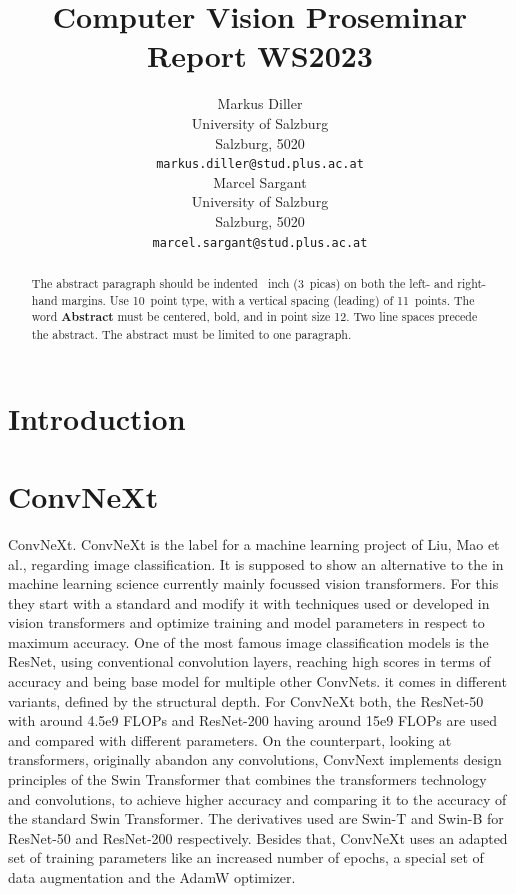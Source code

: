 \documentclass{article}
\title{Computer Vision Proseminar Report WS2023}
\author{%
    Markus Diller\\
    University of Salzburg\\
    Salzburg, 5020 \\
    \texttt{markus.diller@stud.plus.ac.at} \\
    \And
    Marcel Sargant \\
    University of Salzburg \\
    Salzburg, 5020 \\
    \texttt{marcel.sargant@stud.plus.ac.at} \\
}
\begin{document}
\maketitle


\begin{abstract}
    The abstract paragraph should be indented ~inch (3~picas) on both the left- and right-hand margins.
    Use 10~point type, with a vertical spacing (leading) of 11~points.
    The word \textbf{Abstract} must be centered, bold, and in point size 12.
    Two line spaces precede the abstract.
    The abstract must be limited to one paragraph.
\end{abstract}


\section{Introduction}\label{sec:introduction}


\section{ConvNeXt}\label{sec:convnext}
ConvNeXt\cite{liu2022convnet}.
ConvNeXt is the label for a machine learning project of Liu, Mao et al., regarding image classification. It is supposed to show an alternative to the in machine learning science currently mainly focussed vision transformers. For this they start with a standard and modify it with techniques used or developed in vision transformers and optimize training and model parameters in respect to maximum accuracy.
One of the most famous image classification models is the ResNet, using conventional convolution layers, reaching high scores in terms of accuracy and being base model for multiple other ConvNets. it comes in different variants, defined by the structural depth. For ConvNeXt both, the ResNet-50 with around 4.5e9 FLOPs and ResNet-200 having around 15e9 FLOPs are used and compared with different parameters. On the counterpart, looking at transformers, originally abandon any convolutions, ConvNext implements design principles of the Swin Transformer that combines the transformers technology and convolutions, to achieve higher accuracy and comparing it to the accuracy of the standard Swin Transformer. The derivatives used are Swin-T and Swin-B for ResNet-50 and ResNet-200 respectively. Besides that, ConvNeXt uses an adapted set of training parameters like an increased number of epochs, a special set of data augmentation and the AdamW optimizer.
\end{document}
